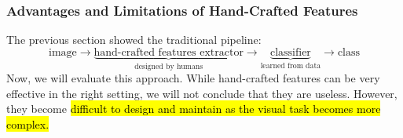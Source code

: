 \subsubsection{Advantages and Limitations of Hand-Crafted Features}\label{sec:advantages-and-limitations-of-hand-crafted-features}

The previous section showed the traditional pipeline:
\begin{equation*}
    \text{image} \to \underbrace{\text{hand-crafted features extractor}}_{\text{designed by humans}} \to \underbrace{\text{classifier}}_{\text{learned from data}} \to \text{class}
\end{equation*}
Now, we will evaluate this approach. While hand-crafted features can be very effective in the right setting, we will not conclude that they are useless. However, they become \hl{difficult to design and maintain as the visual task becomes more complex.}

